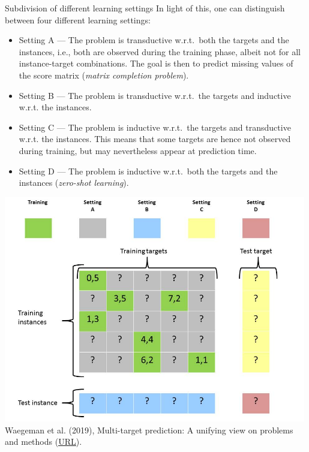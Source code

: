 \documentclass[11pt,compress,t,notes=noshow, xcolor=table]{beamer}
\begin{document}
\begin{frame}{Subdivision of different learning settings}
%	
	\footnotesize
	In light of this, one can distinguish between four different learning settings:
%	
	\begin{itemize} \footnotesize
		\item Setting A --- The problem is transductive w.r.t.\ both the targets and the instances, i.e., both are observed during the training phase, albeit not for all instance-target combinations. The goal is then to predict missing values of the score matrix (\emph{matrix completion problem}).
		\item Setting B --- The problem is transductive w.r.t.\ the targets and inductive w.r.t. the instances. 
%	
	\end{itemize}
%
	\begin{minipage}{0.45\textwidth}
		\begin{itemize} \footnotesize
			\item Setting C --- The problem is inductive w.r.t.\ the targets and transductive w.r.t. the instances. This means that some targets are hence not observed during training, but may nevertheless appear at prediction time.
			\item Setting D --- The problem is inductive w.r.t.\ both the targets and the instances (\emph{zero-shot learning}).
		\end{itemize}
	\end{minipage}
%	
	\begin{minipage}{0.4\textwidth}
	\center
	\includegraphics[width=0.99\textwidth,trim = 0 0 50 0,clip]{figure/Slide16}  \tiny
	\\ Waegeman et al. (2019), Multi-target prediction:
	A unifying view on problems and methods (\href{https://arxiv.org/pdf/1809.02352.pdf}{\underline{URL}}).
	\end{minipage}
\end{frame}



%
\endlecture
\end{document}
